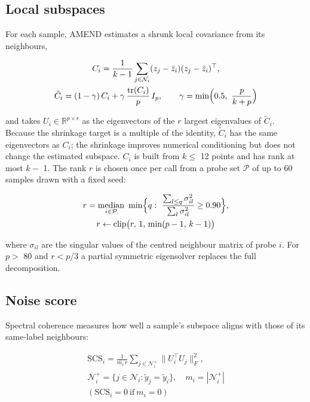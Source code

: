 \documentclass[conference]{IEEEtran}
\begin{document}
\subsection{Local subspaces}\label{sec:local-subspaces}

For each sample, AMEND estimates a shrunk local covariance from its neighbours,

\begin{equation}
\begin{gathered}
C_i=\frac{1}{k-1}\sum_{j\in\mathcal{N}_i}(z_j-\bar{z}_i)(z_j-\bar{z}_i)^{\top},\\
\tilde{C}_i=(1-\gamma)\,C_i+\gamma\,\frac{\operatorname{tr}(C_i)}{p}\,I_p,\qquad \gamma=\min\Bigl(0.5,\ \frac{p}{k+p}\Bigr)
\end{gathered}
\label{eq:3}
\end{equation}

and takes $U_{i} \in  \mathbb{R}^{p\times r}$ as the eigenvectors of the $r$ largest eigenvalues of $\tilde{C}_{i}$. Because the shrinkage target is a multiple of the identity, $\tilde{C}_{i}$ has the same eigenvectors as $C_{i}$; the shrinkage improves numerical conditioning but does not change the estimated subspace. $C_{i}$ is built from $k \le $ 12 points and has rank at most $k -$ 1. The rank $r$ is chosen once per call from a probe set $\mathcal{P}$ of up to 60 samples drawn with a fixed seed:

\begin{equation}
\begin{gathered}
r=\operatorname*{median}_{i\in\mathcal{P}}\ \min\Bigl\{q:\ \frac{\sum_{l\le q}\sigma_{il}^{2}}{\sum_{l}\sigma_{il}^{2}}\ge 0.90\Bigr\},\\
r\leftarrow\operatorname{clip}\bigl(r,\,1,\,\min(p-1,\,k-1)\bigr)
\end{gathered}
\label{eq:4}
\end{equation}

where $\sigma _{il}$ are the singular values of the centred neighbour matrix of probe $i$. For $p >$ 80 and $r < p$/3 a partial symmetric eigensolver replaces the full decomposition.

\subsection{Noise score}\label{sec:noise-score}

Spectral coherence measures how well a sample's subspace aligns with those of its same-label neighbours:

\begin{equation}
\begin{gathered}
\mathrm{SCS}_i=\frac{1}{m_i\,r}\sum_{j\in\mathcal{N}_i^{+}}\bigl\|U_i^{\top}U_j\bigr\|_F^{2},\\
\mathcal{N}_i^{+}=\{j\in\mathcal{N}_i:\tilde{y}_j=\tilde{y}_i\},\quad m_i=|\mathcal{N}_i^{+}|\\
(\mathrm{SCS}_i=0\ \text{if}\ m_i=0)
\end{gathered}
\label{eq:5}
\end{equation}
\end{document}
